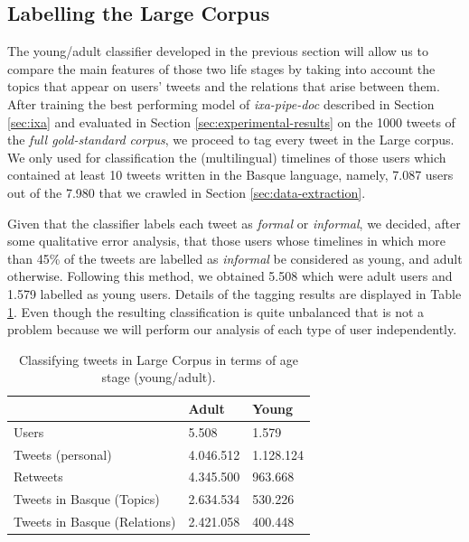 \documentclass[information,article,submit,moreauthors,pdftex,10pt,a4paper]{Definitions/mdpi}
\begin{document}
\subsection{Labelling the Large Corpus}\label{sec:apl}

The young/adult classifier developed in the previous section will allow us to compare the main features of those two life stages by taking into account the topics that appear on users' tweets and the relations that arise between them. After training the best performing model of \emph{ixa-pipe-doc} described in Section \ref{sec:ixa} and evaluated in Section \ref{sec:experimental-results} on the 1000 tweets of the \emph{full gold-standard corpus}, we proceed to tag every tweet in the Large corpus. We only used for classification the (multilingual) timelines of those users which contained at least 10 tweets written in the Basque language, namely, 7.087 users out of the 7.980 that we crawled in Section \ref{sec:data-extraction}.

Given that the classifier labels each tweet as \emph{formal} or \emph{informal}, we decided, after some qualitative error analysis, that those users whose timelines in which more than 45\% of the tweets are labelled as \emph{informal} be considered as young, and adult otherwise. Following this method, we obtained 5.508 which were adult users and 1.579 labelled as young users. Details of the tagging results are displayed in Table \ref{tab:largecorpusdata}. Even though the resulting classification is quite unbalanced that is not a problem because we will perform our analysis of each type of user independently.

\begin{table}[H]
  \centering
  \begin{tabular}{lll} \hline
     & Adult & Young \\ \hline \hline
    Users & 5.508 & 1.579 \\
    Tweets (personal) & 4.046.512 & 1.128.124 \\
    Retweets  & 4.345.500 & 963.668 \\
    Tweets in Basque (Topics) & 2.634.534 & 530.226 \\
    Tweets in Basque (Relations) & 2.421.058 & 400.448 \\ \hline
  \end{tabular}
  \caption{Classifying tweets in Large Corpus in terms of age stage (young/adult).}
  \label{tab:largecorpusdata}
\end{table}
\end{document}
